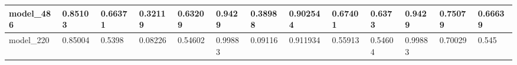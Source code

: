 \begin{tabular}{|l|l|l|l|l|l|l|l|l|l|l|l|l|}
model\_486     & 0.85103     & 0.66371        & 0.32119      & 0.63209          & 0.9429               & 0.38988              & 0.902544     & 0.67401           & 0.6373             & 0.9429          & 0.75079     & 0.66639      \\ \hline
model\_220     & 0.85004     & 0.5398         & 0.08226      & 0.54602          & 0.99883              & 0.09116              & 0.911934     & 0.55913           & 0.54604            & 0.99883         & 0.70029     & 0.545        \\ \hline
\end{tabular}